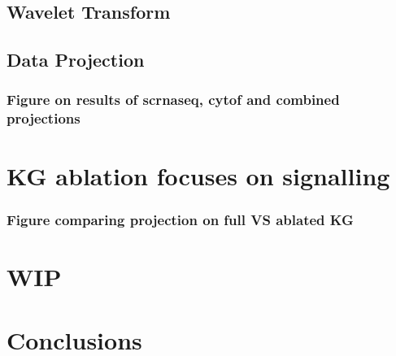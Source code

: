 \subsection{Wavelet Transform}

\subsection{Data Projection}

\subsubsection{Figure on results of scrnaseq, cytof and combined projections}

\section{KG ablation focuses on signalling}

\subsubsection{Figure comparing projection on full VS ablated KG}

\section{WIP}

\section{Conclusions}
